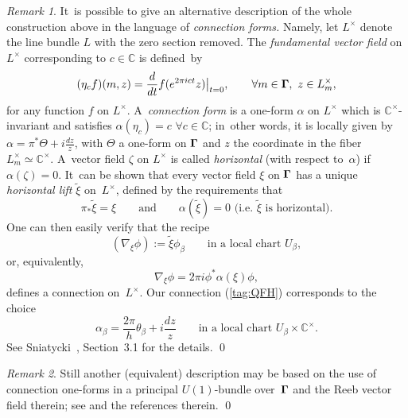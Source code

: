 \documentclass[11pt]{amsart}
\numberwithin{equation}{section}
\theoremstyle{remark}
\newtheorem{remark*}{Remark}
\newcommand\Omg{{\bigam}}   %
\newcommand{\CC}{\C}
\newcommand{\bigam}{\mbox{\boldmath $\Gamma$}}
\newcommand{\C}{\mathbb C}
\begin{document}
\begin{remark*} It~is possible to give an alternative description of the whole
construction above in the language of {\it connection forms.\/} Namely, let
$L^\times$ denote the line bundle $L$ with the zero section removed. The {\it
fundamental vector field\/} on $L^\times$ corresponding to $c\in\CC$ is
defined~by
$$ (\eta_c f)(m,z)=\frac d{dt} f(e^{2\pi i c t}z) \big|_{t=0}, \qquad
\forall m\in \Omg,\ z\in L^\times_m,  $$
for any function $f$ on $L^\times$. A~{\sl connection form\/} is a one-form
$\alpha$ on $L^\times$ which is $\CC^\times$-invariant and satisfies $\alpha
(\eta_c)=c$ $\forall c\in\CC$; in~other words, it is locally given by $\alpha
=\pi^*\Theta+i\frac{dz}z$, with $\Theta$ a one-form on $\Omg$ and $z$ the
coordinate in the fiber $L^\times_m\simeq\CC^\times$. A~vector field $\zeta$ on
$L^\times$ is called {\it horizontal\/} (with respect to~$\alpha$) if $\alpha
(\zeta)=0$. It~can be shown that every vector field $\xi$ on $\Omg$ has a
unique {\sl horizontal lift\/} $\tilde\xi$ on~$L^\times$, defined by the
requirements that
$$ \pi_*\tilde\xi=\xi\qquad\text{and}\qquad \alpha(\tilde\xi)=0
\text{ (i.e.~$\tilde\xi$ is horizontal).}  $$
One can then easily verify that the recipe
$$ (\nabla_\xi \phi) := \tilde\xi \phi_\beta
\qquad\text{in a local chart }U_\beta, $$
or, equivalently,
$$ \nabla_\xi \phi = 2\pi i \phi^*\alpha(\xi) \phi,  $$
defines a connection on~$L^\times$. Our connection (\ref{tag:QFH}) corresponds
to the choice
$$ \alpha_\beta = \frac{2\pi}h \theta_\beta + i\frac{dz}z \qquad
\text{in a local chart } U_\beta\times\CC^\times.  $$
See Sniatycki~\cite{bib:SniaB}, Section~3.1 for the details.   \qed
\end{remark*}

\begin{remark*} Still another (equivalent) description may be based on the use
of connection one-forms in a principal $U(1)$-bundle over~$\Omg$ and the Reeb
vector field therein; see \cite{bib:TuyIrr} and the references therein.   \qed
\end{remark*}

\medskip
\end{document}

